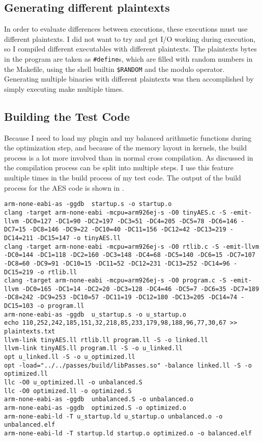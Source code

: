 \subsection{Generating different plaintexts}
In order to evaluate \hammingw{} differences between executions, these executions must use different plaintexts.
I did not want to try and get I/O working during execution, so I compiled different executables with different plaintexts.
The plaintexts bytes in the program are taken as \texttt{\#define}s, which are filled with random numbers in the Makefile, using the shell builtin \texttt{\$RANDOM} and the modulo operator.
Generating multiple binaries with different plaintexts was then accomplished by simply executing make multiple times.

\subsection{Building the Test Code}
\label{buildtest}
Because I need to load my plugin and my balanced arithmetic functions during the optimization step, and because of the memory layout in \qemu{} kernels, the build process is a lot more involved than in normal cross compilation.
As discussed in  the \llvm{} compilation process can be split into multiple steps.
I use this feature multiple times in the build process of my test code.
The output of the build process for the AES code is shown in .

\newpage
\begin{lstlisting}[caption=Output of the Makefile, label=lst:makefile-output]
arm-none-eabi-as -ggdb  startup.s -o startup.o
clang -target arm-none-eabi -mcpu=arm926ej-s -O0 tinyAES.c -S -emit-llvm -DC0=127 -DC1=90 -DC2=197 -DC3=51 -DC4=205 -DC5=78 -DC6=146 -DC7=15 -DC8=146 -DC9=22 -DC10=40 -DC11=156 -DC12=42 -DC13=219 -DC14=211 -DC15=147 -o tinyAES.ll
clang -target arm-none-eabi -mcpu=arm926ej-s -O0 rtlib.c -S -emit-llvm -DC0=144 -DC1=118 -DC2=160 -DC3=148 -DC4=68 -DC5=140 -DC6=15 -DC7=107 -DC8=60 -DC9=91 -DC10=15 -DC11=52 -DC12=231 -DC13=252 -DC14=96 -DC15=219 -o rtlib.ll
clang -target arm-none-eabi -mcpu=arm926ej-s -O0 program.c -S -emit-llvm -DC0=165 -DC1=14 -DC2=20 -DC3=128 -DC4=46 -DC5=7 -DC6=35 -DC7=189 -DC8=242 -DC9=253 -DC10=57 -DC11=19 -DC12=180 -DC13=205 -DC14=74 -DC15=103 -o program.ll
arm-none-eabi-as -ggdb  u_startup.s -o u_startup.o
echo 110,252,242,185,151,32,218,85,233,179,98,188,96,77,30,67 >> plaintexts.txt
llvm-link tinyAES.ll rtlib.ll program.ll -S -o linked.ll
llvm-link tinyAES.ll program.ll -S -o u_linked.ll
opt u_linked.ll -S -o u_optimized.ll
opt -load="../../passes/build/libPasses.so" -balance linked.ll -S -o optimized.ll
llc -O0 u_optimized.ll -o unbalanced.S
llc -O0 optimized.ll -o optimized.S
arm-none-eabi-as -ggdb  unbalanced.S -o unbalanced.o
arm-none-eabi-as -ggdb  optimized.S -o optimized.o
arm-none-eabi-ld -T u_startup.ld u_startup.o unbalanced.o -o unbalanced.elf
arm-none-eabi-ld -T startup.ld startup.o optimized.o -o balanced.elf
\end{lstlisting}

